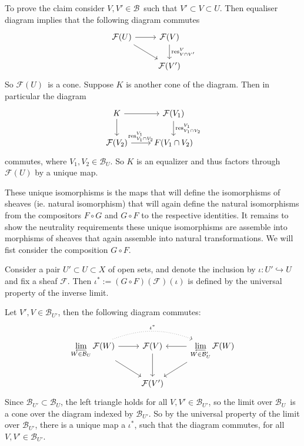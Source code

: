 \documentclass[a4paper,11pt,english]{article}
\DeclareMathOperator{\res}{res}
\newcommand{\B}{\mathcal{B}}
\newcommand{\F}{\mathcal{F}}
\begin{document}
\begin{exercise}[2]
To prove the claim consider $V, V' \in \B$ such that $V' \subset V \subset U$.
Then equaliser diagram implies that the following diagram commutes
\begin{equation*}
\begin{tikzcd}
\F(U) \arrow[r] \arrow[rd] & \F(V) \arrow[d, "\res^V_{V\cap V'}"] \\
& \F(V')
\end{tikzcd}
\end{equation*}
So $\F(U)$ is a cone. Suppose $K$ is another cone of the diagram. Then in
particular the diagram 
\begin{equation*}
\begin{tikzcd}
K \arrow[r] \arrow[d] & \F(V_1) \arrow[d, "\res^{V_1}_{V_1\cap V_2}"] \\
\F(V_2) \arrow[r, "\res^{V_1}_{V_1\cap V_2}"] & F(V_1 \cap V_2) 
\end{tikzcd}
\end{equation*}
commutes, where $V_1, V_2 \in \B_U$. So $K$ is an equalizer and thus factors
through $\F(U)$ by a unique map. 

These unique isomorphisms is the maps that will define the isomorphisms of sheaves
(ie. natural isomorphism) that will again define the natural isomorphisms
from the compositors $F\circ G$ and $G \circ F$ to the respective identities.
It remains to show the neutrality requirements these unique isomorphisms are
assemble into morphisms of sheaves that again assemble into natural
transformations. We will fist consider the composition $G \circ F$. 


Consider a pair $U' \subset U \subset X$ of open sets, and denote the
inclusion by $\iota : U' \hookrightarrow U$ and fix a sheaf $\F$. Then 
$\iota^* := (G \circ F)(\F)(\iota)$ is defined by the universal property of the
inverse limit.

Let $V',V \in \B_{U'}$, then the following diagram commutes:
\begin{equation}
\label{dg:1}
\begin{tikzcd}
\invlim\limits_{W \in \B_U} \F(W) \arrow[r] \arrow[rd] 
\arrow[rr, bend left=20, dotted, "\iota^*"]
& \F(V) \arrow[d] 
& \invlim\limits_{W \in \B_U'} \F(W) \arrow[l] \arrow[ld] \\
& \F(V')
\end{tikzcd} 
\end{equation}
Since $\B_{U'} \subset \B_U$, the left triangle holds for all $V,V' \in \B_{U'}$, so 
the limit over $\B_U$ is a cone over the diagram indexed by $\B_{U'}$.
So by the universal property of the limit over $\B_{U'}$, 
there is a unique map a $\iota^*$, such that the diagram commutes, for all $V,
V' \in \B_{U'}$.


\end{exercise}
\end{document}
